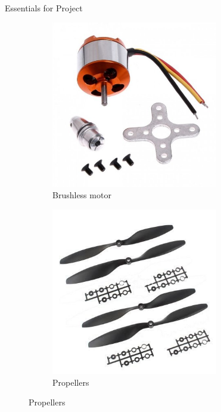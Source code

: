 \documentclass[12pt, oneside]{report}
\numberwithin{equation}{section}
\begin{document}
\begin{chapter}{Essentials for Project}

\begin{figure}[h]
\center
\begin{subfigure}[hb]{0.3\textwidth}
\includegraphics[width=0.8\textwidth]{motor}
\caption{Brushless motor}
\end{subfigure}
\begin{subfigure}[hb]{0.3\textwidth}
\includegraphics[width=0.8\textwidth]{prop}
\caption{Propellers}
\end{subfigure}
\end{figure}


\end{chapter}
\end{document}
